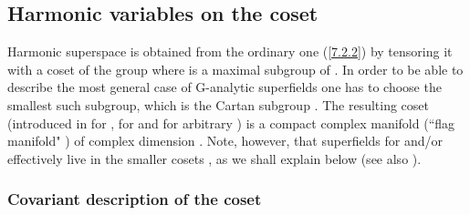 \documentclass[a4paper,12pt]{article}
\begin{document}
\subsection{Harmonic variables on the coset \coordHE{}}

Harmonic superspace is obtained from the ordinary one 
(\ref{7.2.2}) by tensoring it with a coset of the group 
\coordHE{} where \coordHE{} is a maximal subgroup of 
\coordHE{}. In order to be able to describe the most general 
case of G-analytic superfields one has to choose the smallest 
such subgroup, which is the Cartan subgroup 
\coordHE{}. The resulting coset 
\coordHE{} (introduced in \cite{GIK1} for 
\coordHE{}, \cite{GIK2} for \coordHE{} and \cite{Bandos} for arbitrary \coordHE{}) 
is a compact complex manifold (``flag manifold" \cite{Knapp,hh}) 
of complex dimension \coordHE{}. Note, however, that \coordHE{} 
superfields for \coordHE{} and/or \coordHE{} effectively live in 
the smaller cosets \coordHE{}, as we shall explain below (see 
also \cite{hh}). 

\subsubsection{Covariant description of the coset 
\coordHE{}} 
\end{document}
